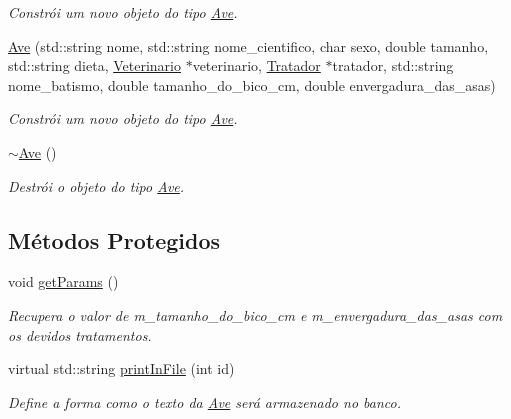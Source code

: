\begin{DoxyCompactItemize}
\begin{DoxyCompactList}\small\item\em Constrói um novo objeto do tipo \hyperlink{classAve}{Ave}. \end{DoxyCompactList}\item 
\hyperlink{classAve_a29d8dd03ea436b1d63399ade9f9107b9}{Ave} (std\+::string nome, std\+::string nome\+\_\+cientifico, char sexo, double tamanho, std\+::string dieta, \hyperlink{classVeterinario}{Veterinario} $\ast$veterinario, \hyperlink{classTratador}{Tratador} $\ast$tratador, std\+::string nome\+\_\+batismo, double tamanho\+\_\+do\+\_\+bico\+\_\+cm, double envergadura\+\_\+das\+\_\+asas)
\begin{DoxyCompactList}\small\item\em Constrói um novo objeto do tipo \hyperlink{classAve}{Ave}. \end{DoxyCompactList}\item 
\mbox{\label{classAve_ad290be8d6fb95f1cfd24b5f55def7741}} 
\hyperlink{classAve_ad290be8d6fb95f1cfd24b5f55def7741}{$\sim$\+Ave} ()
\begin{DoxyCompactList}\small\item\em Destrói o objeto do tipo \hyperlink{classAve}{Ave}. \end{DoxyCompactList}\end{DoxyCompactItemize}
\subsection*{Métodos Protegidos}
\begin{DoxyCompactItemize}
\item 
void \hyperlink{classAve_aff21a20e02d245c9f233fa73a7062602}{get\+Params} ()
\begin{DoxyCompactList}\small\item\em Recupera o valor de m\+\_\+tamanho\+\_\+do\+\_\+bico\+\_\+cm e m\+\_\+envergadura\+\_\+das\+\_\+asas com os devidos tratamentos. \end{DoxyCompactList}\item 
virtual std\+::string \hyperlink{classAve_a41d6ba4bf7e4823274211a9ae908ff1f}{print\+In\+File} (int id)
\begin{DoxyCompactList}\small\item\em Define a forma como o texto da \hyperlink{classAve}{Ave} será armazenado no banco. \end{DoxyCompactList}\end{DoxyCompactItemize}
